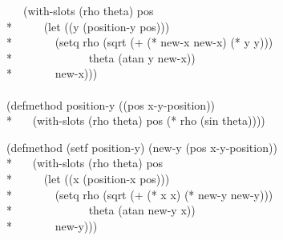 \begin{defun}
\begin{lisp}
~~~(with-slots (rho theta) pos \\*
~~~~~(let ((y (position-y pos))) \\*
~~~~~~~(setq rho (sqrt (+ (* new-x new-x) (* y y))) \\*
~~~~~~~~~~~~~theta (atan y new-x)) \\*
~~~~~~~new-x))) \\
\\
(defmethod position-y ((pos x-y-position)) \\*
~~~(with-slots (rho theta) pos (* rho (sin theta))))
\end{lisp}
\begin{lisp}
(defmethod (setf position-y) (new-y (pos x-y-position)) \\*
~~~(with-slots (rho theta) pos \\*
~~~~~(let ((x (position-x pos))) \\*
~~~~~~~(setq rho (sqrt (+ (* x x) (* new-y new-y))) \\*
~~~~~~~~~~~~~theta (atan new-y x)) \\*
~~~~~~~new-y)))
\end{lisp}
\end{defun}

